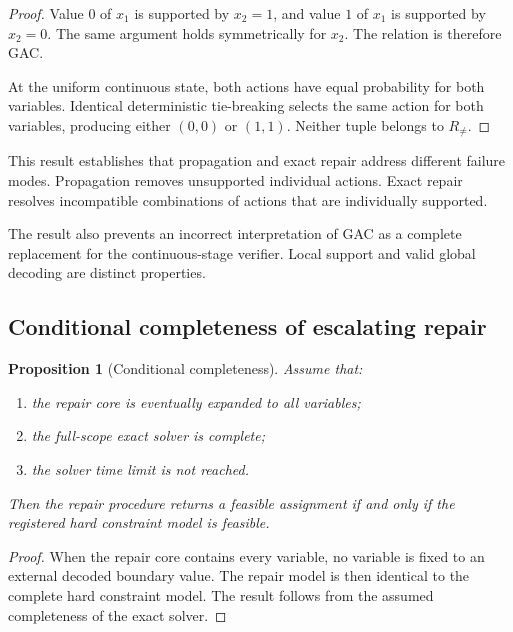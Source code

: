 \documentclass[pdflatex,sn-mathphys-num,iicol,oneside]{sn-jnl}
\newtheorem{proposition}{Proposition}
\begin{document}
\begin{proof}
Value $0$ of $x_1$ is supported by $x_2=1$, and value $1$ of $x_1$ is
supported by $x_2=0$. The same argument holds symmetrically for $x_2$.
The relation is therefore GAC.

At the uniform continuous state, both actions have equal probability
for both variables. Identical deterministic tie-breaking selects the
same action for both variables, producing either $(0,0)$ or $(1,1)$.
Neither tuple belongs to $R_{\neq}$.
\end{proof}

This result establishes that propagation and exact repair address
different failure modes. Propagation removes unsupported individual
actions. Exact repair resolves incompatible combinations of actions
that are individually supported.

The result also prevents an incorrect interpretation of GAC as a
complete replacement for the continuous-stage verifier. Local support
and valid global decoding are distinct properties.

\subsection{Conditional completeness of escalating repair}

\begin{proposition}[Conditional completeness]
Assume that:

\begin{enumerate}
    \item the repair core is eventually expanded to all variables;
    \item the full-scope exact solver is complete;
    \item the solver time limit is not reached.
\end{enumerate}

Then the repair procedure returns a feasible assignment if and only if
the registered hard constraint model is feasible.
\end{proposition}

\begin{proof}
When the repair core contains every variable, no variable is fixed to
an external decoded boundary value. The repair model is then identical
to the complete hard constraint model. The result follows from the
assumed completeness of the exact solver.
\end{proof}
\end{document}
